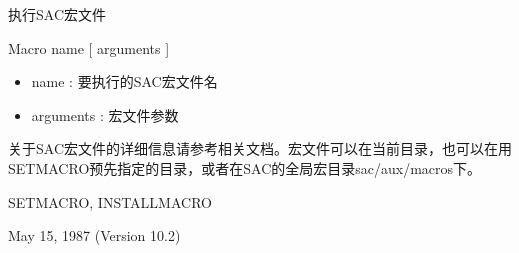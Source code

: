 \label{cmd:macro}

执行SAC宏文件

Macro name [ arguments ]

\begin{itemize}
\item name : 要执行的SAC宏文件名
\item arguments : 宏文件参数
\end{itemize}

关于SAC宏文件的详细信息请参考相关文档。宏文件可以在当前目录，也可以在用SETMACRO预先指定的目录，或者在SAC的全局宏目录sac/aux/macros下。

SETMACRO, INSTALLMACRO

May 15, 1987 (Version 10.2)
